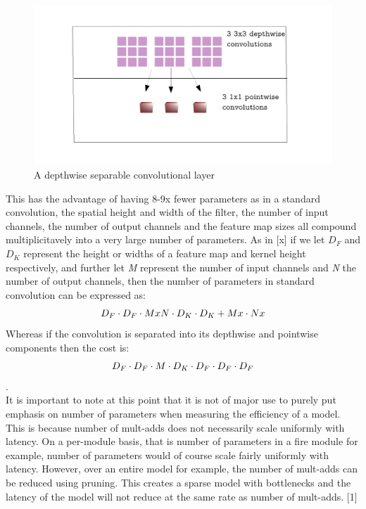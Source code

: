 \documentclass{article}
\begin{document}
\begin{figure}[h]
  \includegraphics[width=\linewidth]{dwlayer.pdf}
  \caption{A depthwise separable convolutional layer}
  \label{fig:dwconvolutionlayer}
\end{figure}


This has the advantage of having 8-9x fewer parameters as in a standard convolution, the spatial height and width of the filter, the number of input channels, the number of output channels and the feature map sizes all compound multiplicitavely into a very large number of parameters. As in [x] if we let \emph{$D_{F}$} and \emph{$D_{K}$} represent the height or widths of a feature map and kernel height respectively, and further let \emph{M} represent the number of input channels and \emph{N} the number of output channels, then the number of parameters in standard convolution can be expressed as: \[\emph{$D_{F}$} \cdot \emph{$D_{F}$} \cdot M x N \cdot \emph{$D_{K}$} \cdot \emph{$D_{K}$} + M x \cdot N x \] Whereas if the convolution is separated into its depthwise and pointwise components then the cost is: \[\emph{$D_{F}$} \cdot \emph{$D_{F}$} \cdot M \cdot \emph{$D_{K}$} \cdot \emph{$D_{F}$} \cdot \emph{$D_{F}$} \cdot \emph{$D_{F}$}\].\\

It is important to note at this point that it is not of major use to purely put emphasis on number of parameters when measuring the efficiency of a model. This is because number of mult-adds does not necessarily scale uniformly with latency. On a per-module basis, that is number of parameters in a fire module for example, number of parameters would of course scale fairly uniformly with latency. However, over an entire model for example, the number of mult-adds can be reduced using pruning. This creates a sparse model with bottlenecks and the latency of the model will not reduce at the same rate as number of mult-adds. [1] \\
\end{document}
